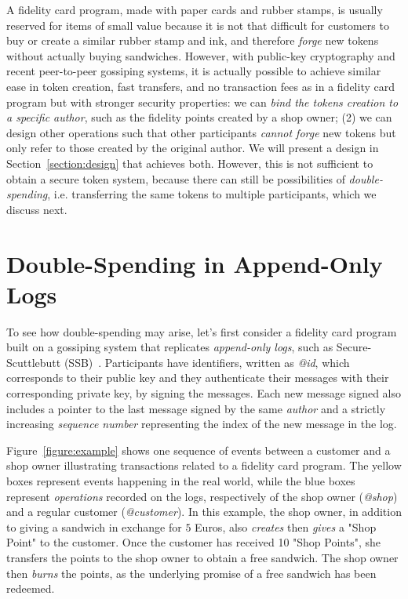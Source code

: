 \documentclass[sigplan,screen,10pt]{acmart}
\begin{document}
A fidelity card program, made with paper cards and rubber stamps, is usually reserved for items of small value because it is not that difficult for customers to buy or create a similar rubber stamp and ink, and therefore \textit{forge} new tokens without actually buying sandwiches. However, with public-key cryptography and recent peer-to-peer gossiping systems, it is actually possible to achieve similar ease in token creation, fast transfers, and no transaction fees as in a fidelity card program but with stronger security properties: we can \textit{bind the tokens creation to a specific author}, such as the fidelity points created by a shop owner; (2) we can design other operations such that other participants \textit{cannot forge} new tokens but only refer to those created by the original author. We will present a design in Section~\ref{section:design} that achieves both. However, this is not sufficient to obtain a secure token system, because there can still be possibilities of \textit{double-spending}, i.e. transferring the same tokens to multiple participants, which we discuss next.

\section{Double-Spending in Append-Only Logs}
\label{section:double-spending}

To see how double-spending may arise, let's first consider a fidelity card program built on a gossiping system that replicates \textit{append-only logs}, such as Secure-Scuttlebutt (SSB)~\cite{kermarrec2020gossiping}. Participants have identifiers, written as \textit{@id}, which corresponds to their public key and they authenticate their messages with their corresponding private key, by signing the messages. Each new message signed also includes a pointer to the last message signed by the same \textit{author} and a strictly increasing \textit{sequence number} representing the index of the new message in the log.  

Figure~\ref{figure:example} shows one sequence of events between a customer and a shop owner illustrating transactions related to a fidelity card program.  The yellow boxes represent events happening in the real world, while the blue boxes represent \textit{operations} recorded on the logs, respectively of the shop owner (\textit{@shop}) and a regular customer (\textit{@customer}). In this example, the shop owner, in addition to giving a sandwich in exchange for $5$ Euros, also \textit{creates} then \textit{gives} a "Shop Point" to the customer. Once the customer has received 10 "Shop Points", she transfers the points to the shop owner to obtain a free sandwich. The shop owner then \textit{burns} the points, as the underlying promise of a free sandwich has been redeemed.
\end{document}
